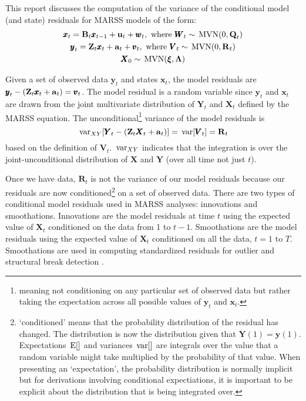 \documentclass[]{article}
\def\xixi{\mbox{\boldmath $\xi$}}
\def\LAM{\mbox{\boldmath $\Lambda$}}
\def\UPS{\mbox{\boldmath $\Upsilon$}}
\def\XI{\mbox{\boldmath $\Xi$}}
\def\BB{\mbox{$\mathbf B$}}	\def\bb{\mbox{$\mathbf b$}} \def\Bb{\mbox{$\mathbf J$}} \def\Ba{\mbox{$\mathbf L$}} \def\Bm{\UPS}
\def\E{\,\textup{\textrm{E}}}
\def\MVN{\,\textup{\textrm{MVN}}}
\def\QQ{\mbox{$\mathbf Q$}}	 \def\qq{\mbox{$\mathbf q$}} \def\Qb{\mbox{$\mathbf G$}}  \def\Qm{\mathbb{Q}}
\def\RR{\mbox{$\mathbf R$}}	 \def\rr{\mbox{$\mathbf r$}} \def\Rb{\mbox{$\mathbf H$}}	\def\Rm{\mathbb{R}}
\def\VV{\mbox{$\pmb{V}$}}	\def\vv{\mbox{$\pmb{v}$}}
\def\WW{\mbox{$\pmb{W}$}}	\def\ww{\mbox{$\pmb{w}$}}
\def\XX{\mbox{$\pmb{X}$}}	\def\xx{\mbox{$\pmb{x}$}}
\def\YY{\mbox{$\pmb{Y}$}}	\def\yy{\mbox{$\pmb{y}$}}
\def\ZZ{\mbox{$\mathbf Z$}}	\def\zz{\mbox{$\mathbf z$}}	\def\Zb{\mbox{$\mathbf M$}} \def\Za{\mbox{$\mathbf N$}} \def\Zm{\XI}
\def\var{\,\textup{\textrm{var}}}
\begin{document}
This report discusses the computation of the variance of the conditional model (and state) residuals for MARSS models of the  form:
\begin{equation}\label{eq:residsMARSS}
\begin{gathered}
\xx_t = \BB_t\xx_{t-1} + \uu_t + \ww_t, \text{ where } \WW_t \sim \MVN(0,\QQ_t)\\
\yy_t = \ZZ_t\xx_t + \aa_t + \vv_t, \text{ where } \VV_t \sim \MVN(0,\RR_t)\\
\XX_0 \sim \MVN(\xixi,\LAM)
\end{gathered}
\end{equation}

Given a set of observed data $\yy_t$ and states $\xx_t$, the model residuals are $\yy_t - (\ZZ_t \xx_t + \aa_t)=\vv_t$.  The model residual is a random variable since $\yy_t$ and $\xx_t$ are drawn from the joint multivariate distribution of $\YY_t$ and $\XX_t$ defined by the MARSS equation.
The unconditional\footnote{meaning not conditioning on any particular set of observed data but rather taking the expectation across all possible values of $\yy_t$ and $\xx_t$.} variance of the model residuals is
\begin{equation}\label{eqn:unconditiondistofVt}
\var_{XY}[\YY_t - (\ZZ_t \XX_t + \aa_t)] = \var[\VV_t] = \RR_t\\
\end{equation}
based on the definition of $\VV_t$.  $\var_{XY}$ indicates that the integration is over the joint-unconditional distribution of $\XX$ and $\YY$ (over all time not just $t$).

Once we have data, $\RR_t$ is not the variance of our model residuals because our residuals are now conditioned\footnote{`conditioned' means that the probability distribution of the residual has changed. The distribution is now the distribution given that $\YY(1)=\yy(1)$. Expectations $\E[ ]$ and variances $\var[ ]$ are integrals over the value that a random variable might take multiplied by the probability of that value. When presenting an   `expectation', the probability distribution is normally implicit but for derivations involving conditional expectiations, it is important to be explicit about the distribution that is being integrated over.} on a set of observed data. There are two types of conditional model residuals used in MARSS analyses: innovations and smoothations.  Innovations are the model residuals at time $t$ using the expected value of $\XX_t$ conditioned on the data from 1 to $t-1$.  Smoothations  are the model residuals using the expected value of $\XX_t$ conditioned on all the data, $t=1$ to $T$.  Smoothations are used in computing standardized residuals for outlier and structural break detection \citep{Harveyetal1998, deJongPenzer1998, CommandeurKoopman2007}.  
\end{document}

